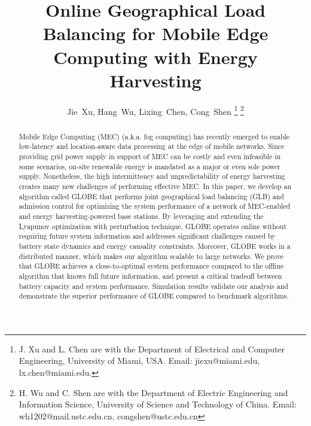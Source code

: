 \documentclass[12pt, draftclsnofoot, letterpaper, onecolumn]{IEEEtran}
\begin{document}
%
\title{Online Geographical Load Balancing for Mobile Edge Computing with Energy Harvesting}


\author{Jie~Xu, Hang~Wu, Lixing~Chen, Cong~Shen
\thanks{J. Xu and L. Chen are with the Department of Electrical and
	Computer Engineering, University of Miami, USA. Email: jiexu@miami.edu, lx.chen@miami.edu.}
\thanks{H. Wu and C. Shen are with the Department of Electric Engineering and Information Science, University of Science and Technology of China. Email: wh1202@mail.ustc.edu.cn, congshen@ustc.edu.cn}
}




\maketitle


\begin{abstract}
Mobile Edge Computing (MEC) (a.k.a. fog computing) has recently emerged to enable low-latency and location-aware data processing at the edge of mobile networks. Since providing grid power supply in support of MEC can be costly and even infeasible in some scenarios, on-site renewable energy is mandated as a major or even sole power supply. Nonetheless, the high intermittency and unpredictability of energy harvesting creates many new challenges of performing effective MEC. In this paper, we develop an algorithm called GLOBE that performs joint geographical load balancing (GLB) and admission control for optimizing the system performance of a network of MEC-enabled and energy harvesting-powered base stations. By leveraging and extending the Lyapunov optimization with perturbation technique, GLOBE operates online without requiring future system information and addresses significant challenges caused by battery state dynamics and energy causality constraints. Moreover, GLOBE works in a distributed manner, which makes our algorithm scalable to large networks. We prove that GLOBE achieves a close-to-optimal system performance compared to the offline algorithm that knows full future information, and present a critical tradeoff between battery capacity and system performance. Simulation results validate our analysis and demonstrate the superior performance of GLOBE compared to benchmark algorithms. \end{abstract}
\end{document}
